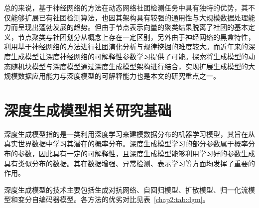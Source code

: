 总的来说，基于神经网络的方法在动态网络社团检测任务中具有独特的优势，其不仅能够扩展已有社团检测算法，也因其架构具有较强的通用性与大规模数据处理能力而呈现出蓬勃发展的趋势。但由于节点表示向量的聚类结果脱离了社团的基本定义，节点聚类与社团划分从概念上存在一定区别，另外由于神经网络的黑盒特性，利用基于神经网络的方法进行社团演化分析与规律挖掘的难度较大。而近年来的深度生成模型让深度神经网络的可解释性参数学习提供了可能。探索将生成模型的动态随机块模型与深度模型通过深度生成模型架构进行结合，实现扩展生成模型的大规模数据应用能力与深度模型的可解释能力也是本文的研究重点之一。
\section{深度生成模型相关研究基础}

深度生成模型指的是一类利用深度学习来建模数据分布的机器学习模型，其旨在从真实世界数据中学习其潜在的概率分布。深度生成模型学习的部分参数属于概率分布的参数，因此具有一定的可解释性，且深度生成模型能够利用学习好的参数生成具有类似分布的数据。其在数据增强、异常检测、表示学习等方面均发挥了重要的作用\cite{foster2022generative,oussidi2018deep}。

深度生成模型的技术主要包括生成对抗网络\cite{goodfellow2020generative}、自回归模型\cite{you2018graphrnn}、扩散模型\cite{kingma2021variational}、归一化流模型\cite{papamakarios2021normalizing}和变分自编码器模型\cite{pinheiro2021variational}。各方法的优劣对比见表~\ref{chap2:tab:dgm}。

\begin{table}[htbp]
	\caption{深度生成模型各技术对比简表}
	\vspace{0.5em}\centering\wuhao
	\label{chap2:tab:dgm}
\end{table}

